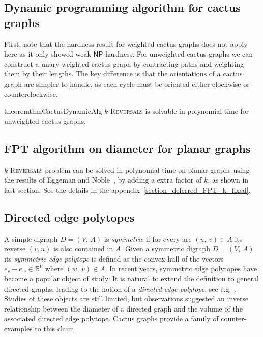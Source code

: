 \documentclass[11pt, twoside]{article}
\numberwithin{equation}{section}
\numberwithin{table}{section}
\numberwithin{figure}{section}
\theoremstyle{definition}
\theoremstyle{definition}
\theoremstyle{definition}
\def\NP{\mathsf{NP}}
\begin{document}
\subsection{Dynamic programming algorithm for cactus graphs }\label{section: cactus}

First, note that the hardness result for weighted cactus graphs does not apply here as it only showed weak $\NP$-hardness.
For unweighted cactus graphs we can construct a unary weighted cactus graph by contracting paths and weighting them by their lengths.
The key difference is that the orientations of a cactus graph are simpler to handle, as each cycle must be oriented either clockwise or counterclockwise. 

\begin{restatable}[$\star$]{theorem}{thmCactusDynamicAlg} \label{thm:cactus}
    \textsc{$k$-Reversals}  is solvable in polynomial time for unweighted cactus graphs.
\end{restatable}


\subsection{FPT algorithm on diameter for planar graphs\label{sec:algo_eggeman_noble}}
\textsc{$k$-Reversals} problem can be solved in polynomial time on planar graphs using the results of Eggeman and Noble~\cite[Thm. 2.5]{eggemann2009minimizing}, by adding a extra factor of $k$, as shown in last section. {See the details in the appendix~\ref{section_deferred_FPT_k_fixed}.}

\subsection{Directed edge polytopes \label{sec:polytopes}}
A simple digraph $D=(V, \, A)$ is \emph{symmetric} if for every arc $(u, \, v) \in A$ its reverse $(v,u)$ is also contained in $A$. Given a symmetric digraph $D=(V, \, A)$ its \emph{symmetric edge polytope} is defined as the convex hull of the vectors $e_v-e_w\in\mathbb{R}^V$ where $(w, \, v)\in A$.
In recent years, symmetric edge polytopes have become a popular object of study.
It is natural to extend the definition to general directed graphs, leading to the notion of a \emph{directed edge polytope}, see e.g.\ \cite{Higashitani_edge_poly}. 
Studies of these objects are still limited, but observations suggested an inverse relationship between the diameter of a directed graph and the volume of the associated directed edge polytope.
Cactus graphs provide a family of counter-examples to this claim.
\end{document}
